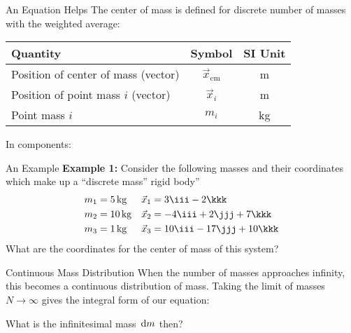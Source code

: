 \documentclass[12pt,compress,aspectratio=169]{beamer}
\begin{document}
\begin{frame}{An Equation Helps}
  The center of mass is defined for discrete number of masses with the weighted
  average:

  \begin{center}
    \begin{tabular}{l|c|c}
      \rowcolor{pink}
      \textbf{Quantity} & \textbf{Symbol} & \textbf{SI Unit} \\ \hline
      Position of center of mass (vector) & $\vec x_\text{cm}$ & \si\metre \\
      Position of point mass $i$ (vector) & $\vec x_i$ & \si\metre \\
      Point mass $i$ & $m_i$ & \si{\kilo\gram}
    \end{tabular}
  \end{center}
  In components:

\end{frame}



\begin{frame}{An Example}
  \textbf{Example 1:} Consider the following masses and their coordinates
  which make up a ``discrete mass'' rigid body''
  \begin{align*}
    m_1&=\SI{5.}{\kg} &\vec x_1&=3\iii-2\kkk\\
    m_2&=\SI{10.}{\kg}&\vec x_2&=-4\iii+2\jjj+7\kkk\\
    m_3&=\SI{1.}{\kg}&\vec x_3&=10\iii-17\jjj+10\kkk
  \end{align*}
  What are the coordinates for the center of mass of this system?
\end{frame}



\begin{frame}{Continuous Mass Distribution}
  When the number of masses approaches infinity, this becomes a continuous
  distribution of mass. Taking the limit of masses $N\rightarrow\infty$ gives
  the integral form of our equation:


  What is the infinitesimal mass $\dl m$ then?
\end{frame}
\end{document}
